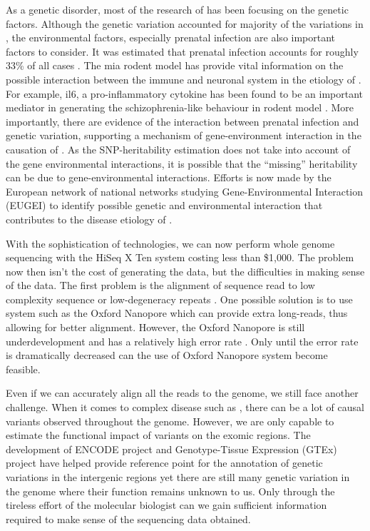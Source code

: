 \documentclass[12pt]{book}
\newcommand*{\glng}{\glsentrylong}
\begin{document}
	As a genetic disorder, most of the research of \glng{scz} has been focusing on the genetic factors. 
	Although the genetic variation accounted for majority of the variations in \glng{scz}, the environmental factors, especially prenatal infection are also important factors to consider. 
	It was estimated that prenatal infection accounts for roughly 33\% of all \glng{scz} cases \citep{Brown2010}.
	The \gls{mia} rodent model has provide vital information on the possible interaction between the immune and neuronal system in the etiology of \glng{scz} \citep{Meyer2007a}.
	For example, \gls{il6}, a pro-inflammatory cytokine has been found to be an important mediator in generating the schizophrenia-like behaviour in rodent model \citep{Smith2007}.
	More importantly, there are evidence of the interaction between prenatal infection and genetic variation, supporting a mechanism of gene-environment interaction in the causation of \glng{scz} \citep{Clarke2009}.
	As the \gls{SNP}-heritability estimation does not take into account of the gene environmental interactions, it is possible that the ``missing'' heritability can be due to gene-environmental interactions. 
	Efforts is now made by the European network of national \glng{scz} networks studying Gene-Environmental Interaction (EUGEI) to identify possible genetic and environmental interaction that contributes to the disease etiology of \glng{scz}.
	
	
	With the sophistication of technologies, we can now perform whole genome sequencing with the HiSeq \RN{10} Ten system costing less than \$1,000. 
	The problem now then isn't the cost of generating the data, but the difficulties in making sense of the data. 
	The first problem is the alignment of sequence read to low complexity sequence or low-degeneracy repeats \citep{Sims2014}. 
	One possible solution is to use system such as the Oxford Nanopore which can provide extra long-reads, thus allowing for better alignment.
	However, the Oxford Nanopore is still underdevelopment and has a relatively high error rate \citep{Mikheyev2014}. 
	Only until the error rate is dramatically decreased can the use of Oxford Nanopore system become feasible. 
	
	Even if we can accurately align all the reads to the genome, we still face another challenge.
	When it comes to complex disease such as \glng{scz}, there can be a lot of causal variants observed throughout the genome. 
	However, we are only capable to estimate the functional impact of variants on the exomic regions.
	The development of ENCODE project \citep{ENCODEProjectConsortium2012} and Genotype-Tissue Expression (GTEx) project \citep{Consortium2015} have helped provide reference point for the annotation of genetic variations in the intergenic regions yet there are still many genetic variation in the genome where their function remains unknown to us. 
	Only through the tireless effort of the molecular biologist can we gain sufficient information required to make sense of the sequencing data obtained.	
	
\end{document}

